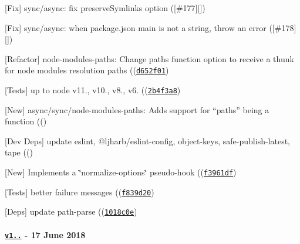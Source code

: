 \begin{DoxyItemize}
\item \mbox{[}Fix\mbox{]} {\ttfamily sync}/{\ttfamily async}\+: fix {\ttfamily preserve\+Symlinks} option (\mbox{[}{\ttfamily \#177}\mbox{]}\mbox{[}\mbox{]})
\item \mbox{[}Fix\mbox{]} {\ttfamily sync}/{\ttfamily async}\+: when package.\+json {\ttfamily main} is not a string, throw an error (\mbox{[}{\ttfamily \#178}\mbox{]}\mbox{[}\mbox{]})
\item \mbox{[}Refactor\mbox{]} {\ttfamily node-\/modules-\/paths}\+: Change {\ttfamily paths} function option to receive a thunk for node modules resolution paths ((\href{https://github.com/browserify/resolve/commit/d652f018b2561f4863ffcd0f3ecdb0dfe65ee223}{\tt {\ttfamily d652f01}})
\item \mbox{[}Tests\mbox{]} up to {\ttfamily node} {\ttfamily v11.}, {\ttfamily v10.}, {\ttfamily v8.}, {\ttfamily v6.} ((\href{https://github.com/browserify/resolve/commit/2b4f3a898a3943e45cdff539b542c4ebee2b608a}{\tt {\ttfamily 2b4f3a8}})
\item \mbox{[}New\mbox{]} {\ttfamily async}/{\ttfamily sync}/{\ttfamily node-\/modules-\/paths}\+: Adds support for “paths” being a function ((\href{https://github.com/browserify/resolve/commit/711287339aad544788a4b8b5335221cea645572c}{\tt {}})
\item \mbox{[}Dev Deps\mbox{]} update {\ttfamily eslint}, {\ttfamily @ljharb/eslint-\/config}, {\ttfamily object-\/keys}, {\ttfamily safe-\/publish-\/latest}, {\ttfamily tape} ((\href{https://github.com/browserify/resolve/commit/554270035e1997ae34865500c629888249baa304}{\tt {}})
\item \mbox{[}New\mbox{]} Implements a \char`\"{}normalize-\/options\char`\"{} pseudo-\/hook ((\href{https://github.com/browserify/resolve/commit/f3961dfcb7b2993d935c255e65309e7028a88b8d}{\tt {\ttfamily f3961df}})
\item \mbox{[}Tests\mbox{]} better failure messages ((\href{https://github.com/browserify/resolve/commit/f839d20ab16ef814214d80183452d02379cbbf15}{\tt {\ttfamily f839d20}})
\item \mbox{[}Deps\mbox{]} update {\ttfamily path-\/parse} ((\href{https://github.com/browserify/resolve/commit/1018c0e49851bfb62176d8adbc94125ae85cd158}{\tt {\ttfamily 1018c0e}})
\end{DoxyItemize}

\paragraph*{\href{https://github.com/browserify/resolve/compare/v1.8.0...v1.8.1}{\tt v1..} -\/ 17 June 2018}


